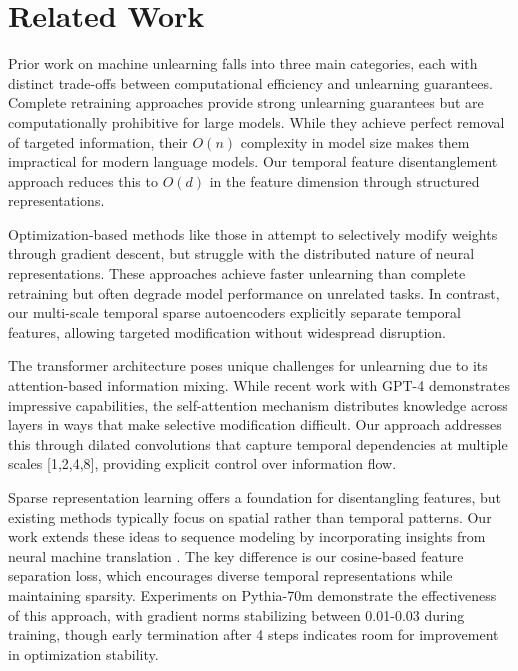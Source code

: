 \documentclass{article} %
\begin{document}
\section{Related Work}
\label{sec:related}

Prior work on machine unlearning falls into three main categories, each with distinct trade-offs between computational efficiency and unlearning guarantees. Complete retraining approaches \cite{graves2020amnesiac} provide strong unlearning guarantees but are computationally prohibitive for large models. While they achieve perfect removal of targeted information, their $O(n)$ complexity in model size makes them impractical for modern language models. Our temporal feature disentanglement approach reduces this to $O(d)$ in the feature dimension through structured representations.

Optimization-based methods like those in \cite{goodfellow2016deep} attempt to selectively modify weights through gradient descent, but struggle with the distributed nature of neural representations. These approaches achieve faster unlearning than complete retraining but often degrade model performance on unrelated tasks. In contrast, our multi-scale temporal sparse autoencoders explicitly separate temporal features, allowing targeted modification without widespread disruption.

The transformer architecture \cite{vaswani2017attention} poses unique challenges for unlearning due to its attention-based information mixing. While recent work with GPT-4 \cite{gpt4} demonstrates impressive capabilities, the self-attention mechanism distributes knowledge across layers in ways that make selective modification difficult. Our approach addresses this through dilated convolutions that capture temporal dependencies at multiple scales [1,2,4,8], providing explicit control over information flow.

Sparse representation learning \cite{goodfellow2016deep} offers a foundation for disentangling features, but existing methods typically focus on spatial rather than temporal patterns. Our work extends these ideas to sequence modeling by incorporating insights from neural machine translation \cite{bahdanau2014neural}. The key difference is our cosine-based feature separation loss, which encourages diverse temporal representations while maintaining sparsity. Experiments on Pythia-70m \cite{radford2019language} demonstrate the effectiveness of this approach, with gradient norms stabilizing between 0.01-0.03 during training, though early termination after 4 steps indicates room for improvement in optimization stability.
\end{document}
